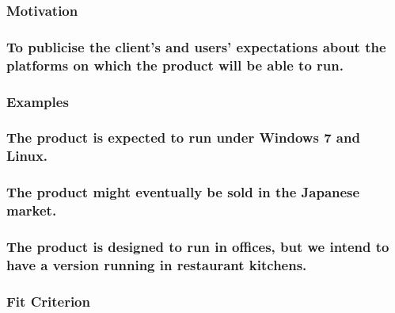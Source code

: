 \documentclass[
]{article}
\begin{document}
\hypertarget{motivation-50}{%
\subsubsection{Motivation}\label{motivation-50}}

\hypertarget{to-publicise-the-clients-and-users-expectations-about-the-platforms-on-which-the-product-will-be-able-to-run.}{%
\subsubsection{To publicise the client's and users' expectations about
the platforms on which the product will be able to
run.}\label{to-publicise-the-clients-and-users-expectations-about-the-platforms-on-which-the-product-will-be-able-to-run.}}

\hypertarget{examples-34}{%
\subsubsection{Examples}\label{examples-34}}

\hypertarget{the-product-is-expected-to-run-under-windows-7-and-linux.}{%
\subsubsection{The product is expected to run under Windows 7 and
Linux.}\label{the-product-is-expected-to-run-under-windows-7-and-linux.}}

\hypertarget{the-product-might-eventually-be-sold-in-the-japanese-market.}{%
\subsubsection{The product might eventually be sold in the Japanese
market.}\label{the-product-might-eventually-be-sold-in-the-japanese-market.}}

\hypertarget{the-product-is-designed-to-run-in-offices-but-we-intend-to-have-a-version-running-in-restaurant-kitchens.}{%
\subsubsection{The product is designed to run in offices, but we intend
to have a version running in restaurant
kitchens.}\label{the-product-is-designed-to-run-in-offices-but-we-intend-to-have-a-version-running-in-restaurant-kitchens.}}

\hypertarget{fit-criterion-10}{%
\subsubsection{Fit Criterion}\label{fit-criterion-10}}
\end{document}

